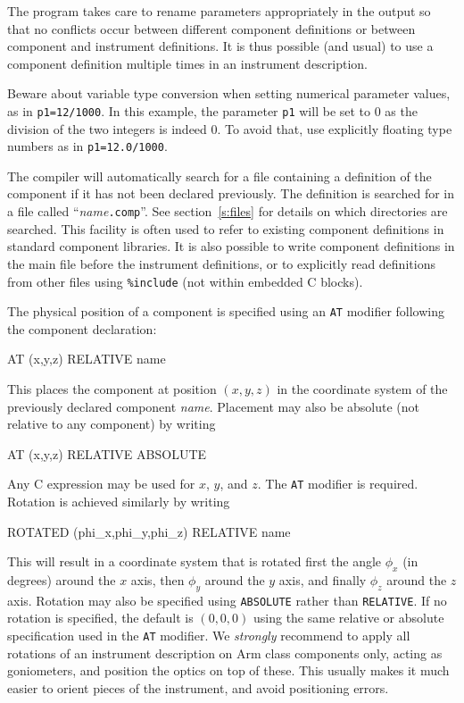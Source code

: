The \MCS program takes care to rename parameters appropriately in the
output so that no conflicts occur between different component
definitions or between component and instrument definitions. It is thus
possible (and usual) to use a component definition multiple times
in an instrument description.

Beware about variable type conversion when setting numerical parameter values, as in \verb+p1=12/1000+. In this example, the parameter \verb+p1+ will be set to 0 as the division of the two integers is indeed 0. To avoid that, use explicitly floating type numbers as in \verb+p1=12.0/1000+.

The compiler \mcs will automatically search for a file containing a
definition of the component if it has not been declared previously. The
definition is searched for in a file called ``\textit{name\/}\texttt{.comp}''. See
section~\ref{s:files} for details on which directories are searched. This
facility is often used to refer to existing component definitions in
standard component libraries. It is also possible to write component
definitions in the main file before the instrument definitions, or to
explicitly read definitions from other files using \verb+%include+
(not within embedded C blocks).

The physical position of a component is specified using an \texttt{AT} modifier
following the component declaration:
\begin{mcstas}
  AT (x,y,z) RELATIVE name
\end{mcstas}
This places the component at position $(x,y,z)$ in the coordinate system
of the previously declared component \textit{name}. Placement may also
be absolute (not relative to any component) by writing
\begin{mcstas}
  AT (x,y,z) RELATIVE ABSOLUTE
\end{mcstas}
Any C expression may be used for $x$, $y$, and $z$. The \texttt{AT}
modifier is required.
Rotation is achieved similarly by writing
\begin{mcstas}
  ROTATED (phi_x,phi_y,phi_z) RELATIVE name
\end{mcstas}
This will result in a coordinate system that is rotated first the angle $\phi_x$
(in degrees) around the $x$ axis, then $\phi_y$ around the $y$ axis, and finally
$\phi_z$ around the $z$ axis. Rotation may also be specified using
\texttt{ABSOLUTE} rather than \texttt{RELATIVE}. If no rotation is specified,
the default is $(0,0,0)$ using the same relative or absolute specification used
in the \texttt{AT} modifier. We \emph{strongly} recommend to apply all rotations
of an instrument description on Arm class components only, acting as
goniometers, and position the optics on top of these. This usually makes it much
easier to orient pieces of the instrument, and avoid positioning errors.

